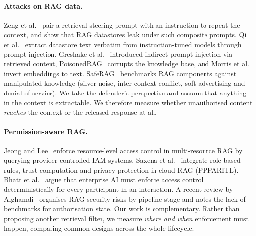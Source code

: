 \documentclass[10pt]{article}
\begin{document}
\paragraph{Attacks on RAG data.}
Zeng et al.~\cite{zeng2024good} pair a retrieval-steering prompt with an instruction to repeat the context, and show that RAG datastores leak under such composite prompts. Qi et al.~\cite{qi2024spill} extract datastore text verbatim from instruction-tuned models through prompt injection. Greshake et al.~\cite{greshake2023} introduced indirect prompt injection via retrieved content, PoisonedRAG~\cite{zou2025poisonedrag} corrupts the knowledge base, and Morris et al.~\cite{morris2023} invert embeddings to text. SafeRAG~\cite{liang2025saferag} benchmarks RAG components against manipulated knowledge (silver noise, inter-context conflict, soft advertising and denial-of-service). We take the defender's perspective and assume that anything in the context is extractable. We therefore measure whether unauthorised content \emph{reaches} the context or the released response at all.

\paragraph{Permission-aware RAG.}
Jeong and Lee~\cite{jeong2025permission} enforce resource-level access control in multi-resource RAG by querying provider-controlled IAM systems. Saxena et al.~\cite{saxena2026pppa} integrate role-based rules, trust computation and privacy protection in cloud RAG (PPPARITL). Bhatt et al.~\cite{bhatt2025participant} argue that enterprise AI must enforce access control deterministically for every participant in an interaction. A recent review by Alghamdi~\cite{alghamdi2026review} organises RAG security risks by pipeline stage and notes the lack of benchmarks for authorisation state. Our work is complementary. Rather than proposing another retrieval filter, we measure \emph{where and when} enforcement must happen, comparing common designs across the whole lifecycle.
\end{document}
